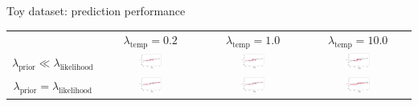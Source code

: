 \documentclass[usenames,dvipsnames,11pt,pdf,utf8,russian,aspectratio=169]{beamer}
\begin{document}
\begin{frame}{Toy dataset: prediction performance}

    \begin{table}
        \centering
        \tiny
        \begin{tabular}{cccc}

             &  $\lambda_\text{temp}=0.2$ & $\lambda_\text{temp}=1.0$ & $\lambda_\text{temp}=10.0$  \\
          $\lambda_\text{prior} \ll \lambda_\text{likelihood}$    & \includegraphics[width=0.25\textwidth]{plot_0_2overfit.png} & \includegraphics[width=0.25\textwidth]{plot_1overfit.png} & \includegraphics[width=0.25\textwidth]{plot_10overfit.png}\\
         $\lambda_\text{prior} = \lambda_\text{likelihood}$    & \includegraphics[width=0.25\textwidth]{plot_0_2ok.png} & \includegraphics[width=0.25\textwidth]{plot_1elbo.png} & \includegraphics[width=0.25\textwidth]{plot_10elbo.png}\\

\end{tabular}
\end{table}
\end{frame}
\end{document}
